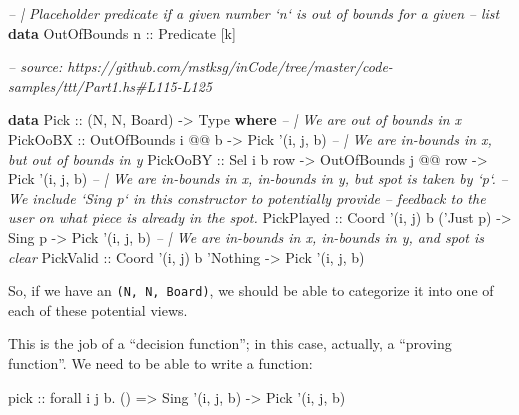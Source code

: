 \documentclass[]{article}
\newenvironment{Shaded}{}{}
\newcommand{\CommentTok}[1]{\textcolor[rgb]{0.38,0.63,0.69}{\textit{#1}}}
\newcommand{\DataTypeTok}[1]{\textcolor[rgb]{0.56,0.13,0.00}{#1}}
\newcommand{\FunctionTok}[1]{\textcolor[rgb]{0.02,0.16,0.49}{#1}}
\newcommand{\KeywordTok}[1]{\textcolor[rgb]{0.00,0.44,0.13}{\textbf{#1}}}
\newcommand{\NormalTok}[1]{#1}
\newcommand{\OtherTok}[1]{\textcolor[rgb]{0.00,0.44,0.13}{#1}}
\begin{document}
\begin{Shaded}
\begin{Highlighting}[]
\CommentTok{-- | Placeholder predicate if a given number `n` is out of bounds for a given}
\CommentTok{-- list}
\KeywordTok{data} \DataTypeTok{OutOfBounds}\OtherTok{ n ::} \DataTypeTok{Predicate}\NormalTok{ [k]}

\CommentTok{-- source: https://github.com/mstksg/inCode/tree/master/code-samples/ttt/Part1.hs#L115-L125}

\KeywordTok{data} \DataTypeTok{Pick}\OtherTok{ ::}\NormalTok{ (}\DataTypeTok{N}\NormalTok{, }\DataTypeTok{N}\NormalTok{, }\DataTypeTok{Board}\NormalTok{) }\OtherTok{->} \DataTypeTok{Type} \KeywordTok{where}
    \CommentTok{-- | We are out of bounds in x}
    \DataTypeTok{PickOoBX}\OtherTok{   ::} \DataTypeTok{OutOfBounds}\NormalTok{ i }\FunctionTok{@@}\NormalTok{ b                         }\OtherTok{->} \DataTypeTok{Pick}\NormalTok{ '(i, j, b)}
    \CommentTok{-- | We are in-bounds in x, but out of bounds in y}
    \DataTypeTok{PickOoBY}\OtherTok{   ::} \DataTypeTok{Sel}\NormalTok{ i b row        }\OtherTok{->} \DataTypeTok{OutOfBounds}\NormalTok{ j }\FunctionTok{@@}\NormalTok{ row }\OtherTok{->} \DataTypeTok{Pick}\NormalTok{ '(i, j, b)}
    \CommentTok{-- | We are in-bounds in x, in-bounds in y, but spot is taken by `p`.}
    \CommentTok{-- We include `Sing p` in this constructor to potentially provide}
    \CommentTok{-- feedback to the user on what piece is already in the spot.}
    \DataTypeTok{PickPlayed}\OtherTok{ ::} \DataTypeTok{Coord}\NormalTok{ '(i, j) b ('}\DataTypeTok{Just}\NormalTok{ p) }\OtherTok{->} \DataTypeTok{Sing}\NormalTok{ p        }\OtherTok{->} \DataTypeTok{Pick}\NormalTok{ '(i, j, b)}
    \CommentTok{-- | We are in-bounds in x, in-bounds in y, and spot is clear}
    \DataTypeTok{PickValid}\OtherTok{  ::} \DataTypeTok{Coord}\NormalTok{ '(i, j) b '}\DataTypeTok{Nothing}                   \OtherTok{->} \DataTypeTok{Pick}\NormalTok{ '(i, j, b)}
\end{Highlighting}
\end{Shaded}

So, if we have an \texttt{(N,\ N,\ Board)}, we should be able to categorize it
into one of each of these potential views.

This is the job of a ``decision function''; in this case, actually, a ``proving
function''. We need to be able to write a function:

\begin{Shaded}
\begin{Highlighting}[]
\OtherTok{pick ::}\NormalTok{ forall i j b}\FunctionTok{.}\NormalTok{ ()}
     \OtherTok{=>} \DataTypeTok{Sing}\NormalTok{ '(i, j, b) }\OtherTok{->} \DataTypeTok{Pick}\NormalTok{ '(i, j, b)}
\end{Highlighting}
\end{Shaded}
\end{document}
